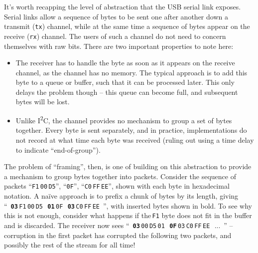 \documentclass[main.tex]{subfiles}
\begin{document}
		It's worth recapping the level of abstraction that the USB serial link exposes.
		Serial links allow a sequence of bytes to be sent one after another down a transmit (\texttt{tx}) channel, while at the same time a sequence of bytes appear on the receive (\texttt{rx}) channel.
		The users of such a channel do not need to concern themselves with raw bits.
		There are two important properties to note here:
		\begin{itemize}[noitemsep]
			\item
				The receiver has to handle the byte as soon as it appears on the receive channel, as the channel has no memory.
				The typical approach is to add this byte to a queue or buffer, such that it can be processed later.
				This only delays the problem though -- this queue can become full, and subsequent bytes will be lost.
			\item
				Unlike I\textsuperscript{2}C, the channel provides no mechanism to group a set of bytes together.
				Every byte is sent separately, and in practice, implementations do not record at what time each byte was received (ruling out using a time delay to indicate \enquote{end-of-group}).
		\end{itemize}

		The problem of \enquote{framing}, then, is one of building on this abstraction to provide a mechanism to group bytes together into packets. Consider the sequence of packets
		\enquote{\texttt{F1}\,\texttt{00}\,\texttt{D5}},
		\enquote{\texttt{0F}},
		\enquote{\texttt{C0}\,\texttt{FF}\,\texttt{EE}}, shown with each byte in hexadecimal notation.
		A na\"ive approach is to prefix a chunk of bytes by its length, giving
		\mbox{\enquote{%
			\textbf{\texttt{03}}\,\texttt{F1}\,\texttt{00}\,\texttt{D5}\,%
			\textbf{\texttt{01}}\,\texttt{0F}\,%
			\textbf{\texttt{03}}\,\texttt{C0}\,\texttt{FF}\,\texttt{EE}%
		}}, with inserted bytes shown in bold.
		To see why this is not enough, consider what happens if the\,\texttt{F1} byte does not fit in the buffer and is discarded. The receiver now sees \mbox{\enquote{%
			\textbf{\texttt{03}}\,\texttt{00}\,\texttt{D5}\,\texttt{01}\,%
			\textbf{\texttt{0F}}\,\texttt{03}\,\texttt{C0}\,\texttt{FF}\,\texttt{EE}\,%
			...%
		}} -- corruption in the first packet has corrupted the following two packets, and possibly the rest of the stream for all time!
\end{document}
